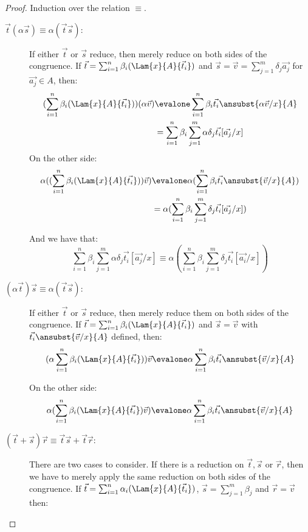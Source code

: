 \begin{proof}
  Induction over the relation $\equiv$. 
  \begin{description}
    \item[$\vec{t} (\alpha\vec{s})\equiv\alpha(\vec{t}\vec{s})$:] If either $\vec{t}$ or $\vec{s}$ reduce, then merely reduce on both sides of the congruence. If $\vec{t} = \sum_{i=1}^{n}\beta_i (\Lam{x}{A}{\vec t_i})$ and $\vec{s}=\vec v= \sum_{j=1}^{m} \delta_j \vec{a_j}$ for $\vec{a_j}\in A$, then:
    \begin{align*}
      (\sum_{i=1}^{n}\beta_i (\Lam{x}{A}{\vec{t_i}})) (\alpha\vec{v})&\evalone\sum_{i=1}^{n}\beta_i \vec{t_i}\ansubst{\alpha\vec{v}/x}{A}\\
      &=\sum_{i=1}^{n}\beta_i \sum_{j=1}^{m}\alpha\delta_j \vec{t_i}[\vec{a_j}/x]
    \end{align*}
    On the other side:
    \begin{align*}  
    \alpha((\sum_{i=1}^{n}\beta_i (\Lam{x}{A}{\vec{t_i}}))\vec v)&\evalone
    \alpha(\sum_{i=1}^{n}\beta_i \vec{t_i}\ansubst{\vec{v}/x}{A})\\
    &=\alpha(\sum_{i=1}^{n}\beta_i\sum_{j=1}^{m}\delta_j\vec{t_i}[\vec{a_j}/x])
    \end{align*}

    And we have that: 
    \[\sum_{i=1}^{n}\beta_i \sum_{j=1}^{m}\alpha\delta_j \vec{t_i}[\vec{a_j}/x] \equiv \alpha(\sum_{i=1}^{n}\beta_i\sum_{j=1}^{m}\delta_j\vec{t_i}[\vec{a_i}/x])\]

    \item[$(\alpha\vec{t})\vec{s}\equiv\alpha(\vec{t}\vec{s})$:] If either $\vec{t}$ or $\vec{s}$ reduce, then merely reduce them on both sides of the congruence. If $\vec{t} = \sum_{i=1}^{n}\beta_i (\Lam{x}{A}{\vec t_i})$ and $\vec{s}=\vec v$ with $\vec{t_i}\ansubst{\vec{v}/x}{A}$ defined, then:
    \[
    (\alpha\sum_{i=1}^{n}\beta_i (\Lam{x}{A}{\vec{t_i}}))\vec v \evalone
    \alpha\sum_{i=1}^{n}\beta_i \vec{t_i}\ansubst{\vec v/x}{A}
    \]
    
    On the other side:
    \[  
      \alpha(\sum_{i=1}^{n}\beta_i (\Lam{x}{A}{\vec{t_i}})\vec v) \evalone
      \alpha\sum_{i=1}^{n}\beta_i \vec{t_i}\ansubst{\vec v/x}{A}
    \]

    \item[$(\vec{t}+\vec{s})\vec{r}\equiv \vec{t}\vec{s} + \vec{t}\vec{r}$:] There are two cases to consider. If there is a reduction on $\vec t,\vec s$ or $\vec r$, then we have to merely apply the same reduction on both sides of the congruence. If $\vec t=\sum_{i=1}^{n}\alpha_i (\Lam{x}{A}{\vec t_i})$, $\vec s=\sum_{j=1}^{m}\beta_j $ and $\vec r= \vec v$ then:
    

\end{description}
\end{proof}
